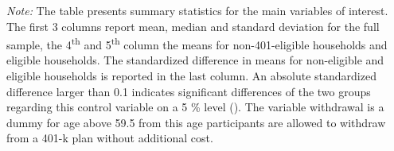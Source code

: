 \documentclass[10pt,a4paper]{article}
\begin{document}
\begin{singlespace}
			\def\sym#1{\ifmmode^{#1}\else\(^{#1}\)\fi}
			\begin{ThreePartTable}
				\begin{TableNotes}
					\begin{scriptsize}
					\item \textit{Note:} The table presents summary statistics for the main variables of interest. The first 3 columns report mean, median and standard deviation for the full sample, the 4\textsuperscript{th} and 5\textsuperscript{th} column the means for non-401-eligible households and eligible households. The standardized difference in means for non-eligible and eligible households is reported in the last column. An absolute standardized difference larger than 0.1 indicates significant differences of the two groups regarding this control variable on a 5 \% level (\cite{standardized_difference}). The variable withdrawal is a dummy for age above 59.5 \textemdash from this age participants are allowed to withdraw from a 401-k plan without additional cost.
					\end{scriptsize}
				\end{TableNotes}
				

\end{ThreePartTable}
\end{singlespace}
\end{document}
